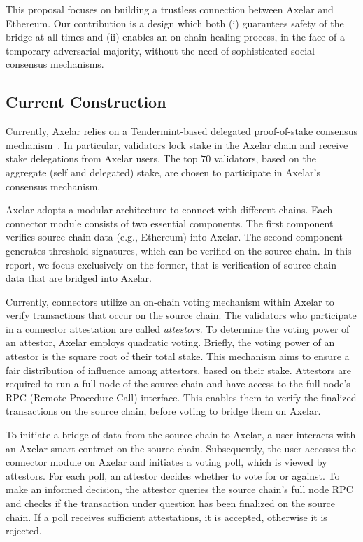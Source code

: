This proposal focuses on building a trustless connection between Axelar and Ethereum. Our contribution is a design which both (i) guarantees safety of the bridge at all times and (ii) enables an on-chain healing process, in the face of a temporary adversarial majority, without the need of sophisticated social consensus mechanisms.

\subsection{Current Construction}
Currently, Axelar relies on a Tendermint-based delegated proof-of-stake consensus mechanism~\cite{axelar-whitepaper}. In particular, validators lock stake in the Axelar chain and receive stake delegations from Axelar users. The top $70$ validators, based on the aggregate (self and delegated) stake, are chosen to participate in Axelar's consensus mechanism.

Axelar adopts a modular architecture to connect with different chains. Each connector module consists of two essential components. The first component verifies source chain data (e.g., Ethereum) into Axelar. The second component generates threshold signatures, which can be verified on the source chain. In this report, we focus exclusively on the former, that is verification of source chain data that are bridged into Axelar.

Currently, connectors utilize an on-chain voting mechanism within Axelar to verify transactions that occur on the source chain. The validators who participate in a connector attestation are called \emph{attestors}. To determine the voting power of an attestor, Axelar employs quadratic voting. Briefly, the voting power of an attestor is the square root of their total stake. This mechanism aims to ensure a fair distribution of influence among attestors, based on their stake. Attestors are required to run a full node of the source chain and have access to the full node's RPC (Remote Procedure Call) interface. This enables them to verify the finalized transactions on the source chain, before voting to bridge them on Axelar.

To initiate a bridge of data from the source chain to Axelar, a user interacts with an Axelar smart contract on the source chain. Subsequently, the user accesses the connector module on Axelar and initiates a voting poll, which is viewed by attestors. For each poll, an attestor decides whether to vote for or against. To make an informed decision, the attestor queries the source chain's full node RPC and checks if the
transaction under question has been finalized on the source chain. If a poll receives sufficient attestations, it is accepted, otherwise it is rejected.

